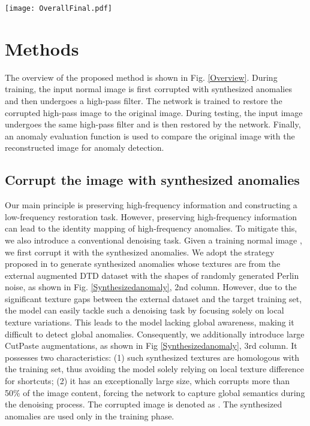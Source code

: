 \documentclass[5p, twocolumn]{elsarticle}[draft]
\begin{document}
\begin{figure*}[h]
    \centering
		\texttt{[image: OverallFinal.pdf]}
	\caption{The overview of the proposed method.}
	\label{Overview}
\end{figure*}

\section{Methods}
\label{30}
The overview of the proposed method is shown in Fig. \ref{Overview}. During training, the input normal image is first corrupted with synthesized anomalies and then undergoes a high-pass filter. The network is trained to restore the corrupted high-pass image to the original image. During testing, the input image undergoes the same high-pass filter and is then restored by the network. Finally, an anomaly evaluation function is used to compare the original image with the reconstructed image for anomaly detection.

\subsection{Corrupt the image with synthesized anomalies}
\label{sec3.1}
Our main principle is preserving high-frequency information and constructing a low-frequency restoration task. However, preserving high-frequency information can lead to the identity mapping of high-frequency anomalies. To mitigate this, we also introduce a conventional denoising task. Given a training normal image , we first corrupt it with the synthesized anomalies. We adopt the strategy proposed in \cite{zavrtanik2021draem} to generate synthesized anomalies whose textures are from the external augmented DTD \cite{cimpoi2014describing} dataset with the shapes of randomly generated Perlin noise, as shown in Fig. \ref{Synthesizedanomaly}, 2nd column. However, due to the significant texture gaps between the external dataset and the target training set, the model can easily tackle such a denoising task by focusing solely on local texture variations. This leads to the model lacking global awareness, making it difficult to detect global anomalies. Consequently, we additionally introduce large CutPaste \cite{li2021cutpaste} augmentations, as shown in Fig \ref{Synthesizedanomaly}, 3rd column. It possesses two characteristics: (1) such synthesized textures are homologous with the training set, thus avoiding the model solely relying on local texture difference for shortcuts; (2) it has an exceptionally large size, which corrupts more than 50\% of the image content, forcing the network to capture global semantics during the denoising process. The corrupted image is denoted as . The synthesized anomalies are used only in the training phase. 
\end{document}
